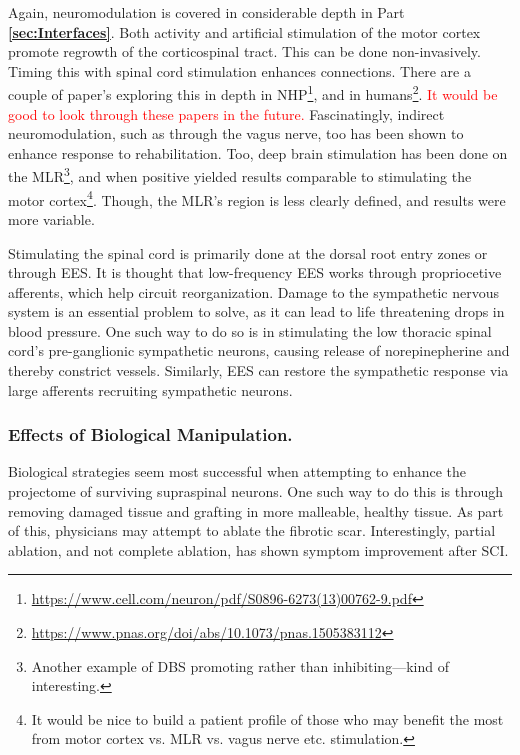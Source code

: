 Again, neuromodulation is covered in considerable depth in Part \textbf{\ref{sec:Interfaces}}. Both activity and artificial stimulation of the motor cortex promote regrowth of the corticospinal tract. This can be done non-invasively. Timing this with spinal cord stimulation enhances connections. There are a couple of paper's exploring this in depth in NHP\footnote{\url{https://www.cell.com/neuron/pdf/S0896-6273(13)00762-9.pdf}}, and in humans\footnote{\url{https://www.pnas.org/doi/abs/10.1073/pnas.1505383112}}. \textcolor{red}{It would be good to look through these papers in the future.} Fascinatingly, indirect neuromodulation, such as through the vagus nerve, too has been shown to enhance response to rehabilitation. Too, deep brain stimulation has been done on the MLR\footnote{Another example of DBS promoting rather than inhibiting---kind of interesting.}, and when positive yielded results comparable to stimulating the motor cortex\footnote{It would be nice to build a patient profile of those who may benefit the most from motor cortex vs. MLR vs. vagus nerve etc. stimulation.}. Though, the MLR's region is less clearly defined, and results were more variable.\newline

Stimulating the spinal cord is primarily done at the dorsal root entry zones or through EES. It is thought that low-frequency EES works through propriocetive afferents, which help circuit reorganization. Damage to the sympathetic nervous system is an essential problem to solve, as it can lead to life threatening drops in blood pressure. One such way to do so is in stimulating the low thoracic spinal cord's pre-ganglionic sympathetic neurons, causing release of norepinepherine and thereby constrict vessels. Similarly, EES can restore the sympathetic response via large afferents recruiting sympathetic neurons. 

\subsubsection{Effects of Biological Manipulation.}

Biological strategies seem most successful when attempting to enhance the projectome of surviving supraspinal neurons. One such way to do this is through removing damaged tissue and grafting in more malleable, healthy tissue. As part of this, physicians may attempt to ablate the fibrotic scar. Interestingly, partial ablation, and not complete ablation, has shown symptom improvement after SCI. \newline

